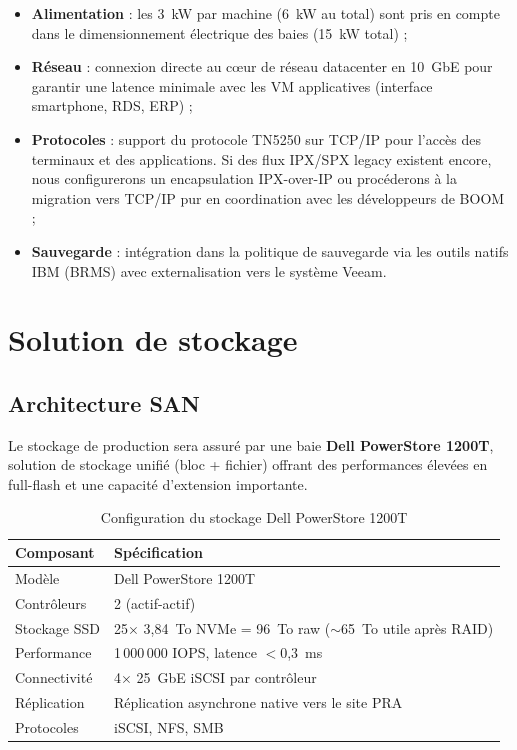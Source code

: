 \documentclass[12pt,a4paper]{report}
\begin{document}
\begin{itemize}
\item \textbf{Alimentation} : les 3~kW par machine (6~kW au total) sont pris en compte dans le dimensionnement électrique des baies (15~kW total) ;
\item \textbf{Réseau} : connexion directe au c\oe ur de réseau datacenter en 10~GbE pour garantir une latence minimale avec les VM applicatives (interface smartphone, RDS, ERP) ;
\item \textbf{Protocoles} : support du protocole TN5250 sur TCP/IP pour l'accès des terminaux et des applications. Si des flux IPX/SPX legacy existent encore, nous configurerons un encapsulation IPX-over-IP ou procéderons à la migration vers TCP/IP pur en coordination avec les développeurs de BOOM ;
\item \textbf{Sauvegarde} : intégration dans la politique de sauvegarde via les outils natifs IBM (BRMS) avec externalisation vers le système Veeam.
\end{itemize}

\section{Solution de stockage}

\subsection{Architecture SAN}

Le stockage de production sera assuré par une baie \textbf{Dell PowerStore 1200T}, solution de stockage unifié (bloc + fichier) offrant des performances élevées en full-flash et une capacité d'extension importante.

\begin{table}[H]
\centering
\begin{tabularx}{\textwidth}{L{4cm}L{9cm}}
\toprule
\textbf{Composant} & \textbf{Spécification} \\
\midrule
Modèle & Dell PowerStore 1200T \\
Contrôleurs & 2 (actif-actif) \\
Stockage SSD & 25$\times$ 3,84~To NVMe = 96~To raw ($\sim$65~To utile après RAID) \\
Performance & 1\,000\,000 IOPS, latence $<$0,3~ms \\
Connectivité & 4$\times$ 25~GbE iSCSI par contrôleur \\
Réplication & Réplication asynchrone native vers le site PRA \\
Protocoles & iSCSI, NFS, SMB \\
\bottomrule
\end{tabularx}
\caption{Configuration du stockage Dell PowerStore 1200T}
\label{tab:stockage}
\end{table}
\end{document}
